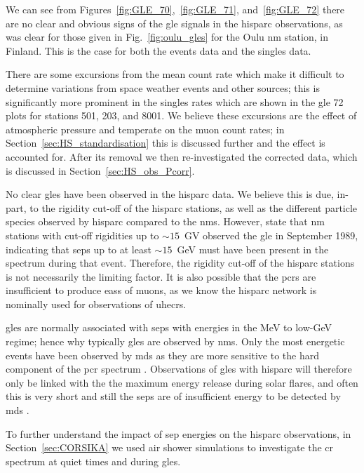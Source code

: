 We can see from Figures~\ref{fig:GLE_70},~\ref{fig:GLE_71}, and~\ref{fig:GLE_72} there are no clear and obvious signs of the \gls{gle} signals in the \gls{hisparc} observations, as was clear for those given in Fig.~\ref{fig:oulu_gles} for the Oulu \gls{nm} station, in Finland. This is the case for both the events data and the singles data.

There are some excursions from the mean count rate which make it difficult to determine variations from space weather events and other sources; this is significantly more prominent in the singles rates which are shown in the \gls{gle} 72 plots for stations 501, 203, and 8001. We believe these excursions are the effect of atmospheric pressure and temperate on the muon count rates; in Section~\ref{sec:HS_standardisation} this is discussed further and the effect is accounted for. After its removal we then re-investigated the corrected data, which is discussed in Section~\ref{sec:HS_obs_Pcorr}.

No clear \glspl{gle} have been observed in the \gls{hisparc} data. We believe this is due, in-part, to the rigidity cut-off of the \gls{hisparc} stations, as well as the different particle species observed by \gls{hisparc} compared to the \glspl{nm}. However, \citet{humble_j._e._detection_2012} state that \gls{nm} stations with cut-off rigidities up to $\sim 15$~GV observed the \gls{gle} in September 1989, indicating that \glspl{sep} up to at least $\sim 15$~GeV must have been present in the spectrum during that event. Therefore, the rigidity cut-off of the \gls{hisparc} stations is not necessarily the limiting factor. It is also possible that the \glspl{pcr} are insufficient to produce \glspl{eas} of muons, as we know the \gls{hisparc} network is nominally used for observations of \glspl{uhecr}.

\glspl{gle} are normally associated with \glspl{sep} with energies in the MeV to low-GeV regime; hence why typically \glspl{gle} are observed by \glspl{nm}. Only the most energetic events have been observed by \glspl{md} as they are more sensitive to the hard component of the \gls{pcr} spectrum \citep{augusto_signals_2016}. Observations of \glspl{gle} with \gls{hisparc} will therefore only be linked with the the maximum energy release during solar flares, and often this is very short and still the \glspl{sep} are of insufficient energy to be detected by \glspl{md} \citep{mccracken_high-energy_2012, augusto_signals_2016}. 

To further understand the impact of \gls{sep} energies on the \gls{hisparc} observations, in Section~\ref{sec:CORSIKA} we used air shower simulations to investigate the \gls{cr} spectrum at quiet times and during \glspl{gle}. %


